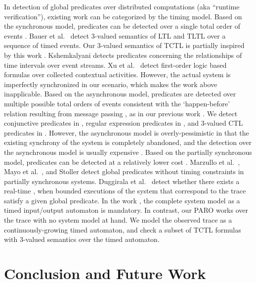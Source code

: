 \documentclass[10pt,conference,compsocconf,letterpaper]{IEEEtran}
\begin{document}
In detection of global predicates over distributed computations (aka ``runtime verification''), existing work can be categorized by the timing model. Based on the synchronous model, predicates can be detected over a single total order of events \cite{Bauer11, Kshemkalyani07, Xu05}. Bauer et al.~\cite{Bauer11} detect 3-valued semantics of LTL and TLTL over a sequence of timed events. Our 3-valued semantics of TCTL is partially inspired by this work \cite{Bauer11}. Kshemkalyani \cite{Kshemkalyani07} detects predicates concerning the relationships of time intervals over event streams. Xu et al.~\cite{Xu05} detect first-order logic based formulas over collected contextual activities. However, the actual system is imperfectly synchronized in our scenario, which makes the work above inapplicable. Based on the asynchronous model, predicates are detected over multiple possible total orders of events consistent with the `happen-before' relation resulting from message passing \cite{Cooper91, Babaoglu93, Schwarz94, Garg96}, as in our previous work \cite{Huang09, Huang12, Yang13, Wei12}. We detect conjunctive predicates in \cite{Huang09, Huang12}, regular expression predicates in \cite{Yang13}, and 3-valued CTL predicates in \cite{Wei12}. However, the asynchronous model is overly-pessimistic in that the existing synchrony of the system is completely abandoned, and the detection over the asynchronous model is usually expensive \cite{Yang13, Wei12}. Based on the partially synchronous model, predicates can be detected at a relatively lower cost \cite{Marzullo91, Mayo95, Stoller00, Duggirala12}. Marzullo et al.~\cite{Marzullo91}, Mayo et al.~\cite{Mayo95}, and Stoller \cite{Stoller00} detect global predicates without timing constraints in partially synchronous systems. Duggirala et al.~\cite{Duggirala12} detect whether there exists a real-time , when bounded executions of the system that correspond to the trace satisfy a given global predicate. In the work \cite{Duggirala12}, the complete system model as a timed input/output automaton is mandatory. In contrast, our \textsf{PARO} works over the trace with no system model at hand. We model the observed trace as a continuously-growing timed automaton, and check a subset of TCTL formulas with 3-valued semantics over the timed automaton.

\section{Conclusion and Future Work} \label{sec:Conclusion}
\end{document}

